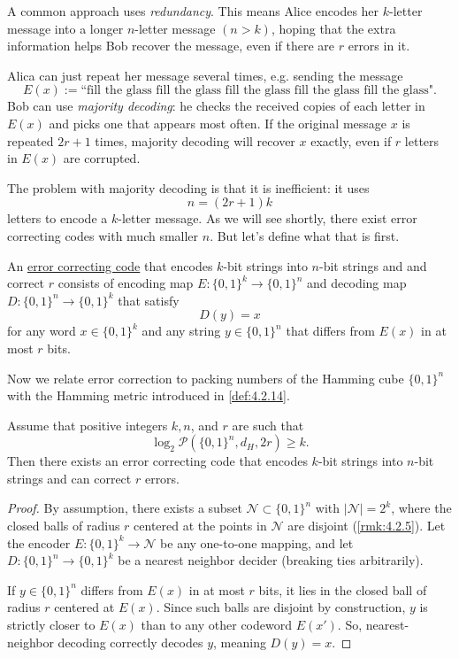A common approach uses \textit{redundancy}. This means Alice encodes her $k$-letter message into a longer 
$n$-letter message $(n > k)$, hoping that the extra information helps Bob recover the message, even if there are 
$r$ errors in it.

\begin{example}
Alica can just repeat her message several times, e.g. sending the message 
\[ E(x) := \text{``fill the glass fill the glass fill the glass fill the glass fill the glass"}. \]
Bob can use \textit{majority decoding}: he checks the received copies of each letter in $E(x)$ and picks one 
that appears most often. If the original message $x$ is repeated $2r + 1$ times, majority decoding will recover 
$x$ exactly, even if $r$ letters in $E(x)$ are corrupted.
\end{example}

The problem with majority decoding is that it is inefficient: it uses 
\[ n = (2r + 1)k \]
letters to encode a $k$-letter message. As we will see shortly, there exist error correcting codes with much 
smaller $n$. But let's define what that is first.

\begin{definition}[]
\label{def:4.3.3}
An \underline{error correcting code} that encodes $k$-bit strings into $n$-bit strings and and correct $r$
consists of encoding map $E: \{0, 1\}^k \to \{ 0, 1 \}^n$ and decoding map $D: \{ 0, 1 \}^n \to \{ 0, 1 \}^k$ 
that satisfy 
\[ D(y) = x \]
for any word $x \in \{ 0, 1 \}^k$ and any string $y \in \{ 0, 1 \}^n$ that differs from $E(x)$ in at most 
$r$ bits.
\end{definition}

Now we relate error correction to packing numbers of the Hamming cube $\{ 0, 1 \}^n$ with the Hamming metric 
introduced in \cref{def:4.2.14}. 

\begin{lemma}
\label{lem:4.3.4}
Assume that positive integers $k, n$, and $r$ are such that 
\[ \log_{2}{\mathcal{P}(\{ 0, 1 \}^n, d_H, 2r)} \geq k. \]
Then there exists an error correcting code that encodes $k$-bit strings into $n$-bit strings and can correct $r$ 
errors.
\end{lemma}

\begin{proof}
By assumption, there exists a subset $\mathcal{N} \subset \{ 0, 1 \}^n$ with $|\mathcal{N}| = 2^k$, where the 
closed balls of radius $r$ centered at the points in $\mathcal{N}$ are disjoint (\cref{rmk:4.2.5}). Let the 
encoder $E: \{ 0, 1 \}^k \to \mathcal{N}$ be any one-to-one mapping, and let $D: \{ 0, 1 \}^n \to \{ 0, 1 \}^k$ 
be a nearest neighbor decider (breaking ties arbitrarily).

If $y \in \{ 0, 1 \}^n$ differs from $E(x)$ in at most $r$ bits, it lies in the closed ball of radius $r$ 
centered at $E(x)$. Since such balls are disjoint by construction, $y$ is strictly closer to $E(x)$ than to any 
other codeword $E(x')$. So, nearest-neighbor decoding correctly decodes $y$, meaning $D(y) = x$.
\end{proof}

